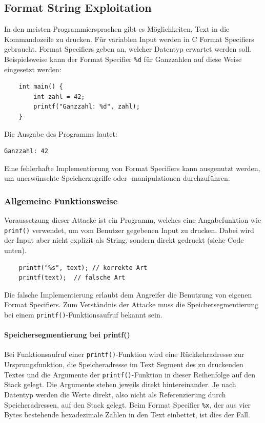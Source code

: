 \documentclass[11pt, a4paper]{article}
\begin{document}
\subsection{Format String Exploitation}
In den meisten Programmiersprachen gibt es Möglichkeiten, Text in die Kommandozeile zu drucken. Für variablen Input werden in C Format Specifiers gebraucht. Format Specifiers geben an, welcher Datentyp erwartet werden soll. Beispielsweise kann der Format Specifier \texttt{\%d} für Ganzzahlen auf diese Weise eingesetzt werden: 
\begin{lstlisting}
	int main() {
		int zahl = 42;
		printf("Ganzzahl: %d", zahl);  
	}
\end{lstlisting}
Die Ausgabe des Programms lautet:
\begin{lstlisting}[style=COutputStyle]
	Ganzzahl: 42
\end{lstlisting}

Eine fehlerhafte Implementierung von Format Specifiers kann ausgenutzt werden, um unerwünschte Speicherzugriffe oder -manipulationen durchzuführen. 

\subsubsection{Allgemeine Funktionsweise}
Voraussetzung dieser Attacke ist ein Programm, welches eine Angabefunktion wie \texttt{prinf()} verwendet, um vom Benutzer gegebenen Input zu drucken. Dabei wird der Input aber nicht explizit als String, sondern direkt gedruckt (siehe Code unten).
\begin{lstlisting}
	printf("%s", text); // korrekte Art
	printf(text);  // falsche Art
\end{lstlisting}

Die falsche Implementierung erlaubt dem Angreifer die Benutzung von eigenen Format Specifiers. Zum Verständnis der Attacke muss die Speichersegmentierung bei einem \texttt{printf()}-Funktionsaufruf bekannt sein. 

\paragraph{Speichersegmentierung bei printf()}
Bei Funktionsaufruf einer \texttt{printf()}-Funktion wird eine Rückkehradresse zur Ursprungsfunktion, die Speicheradresse im Text Segment des zu druckenden Textes und die Argumente der \texttt{printf()}-Funktion in dieser Reihenfolge auf den Stack gelegt. Die Argumente stehen jeweils direkt hintereinander. Je nach Datentyp werden die Werte direkt, also nicht als Referenzierung durch Speicheradressen, auf den Stack gelegt. Beim Format Specifier \texttt{\%x}, der aus vier Bytes bestehende hexadezimale Zahlen in den Text einbettet, ist dies der Fall. 
\end{document}

